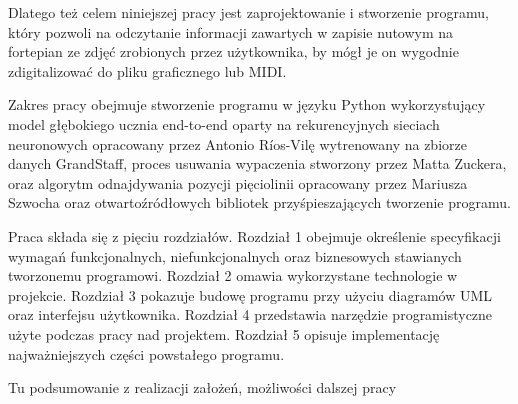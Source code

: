 \documentclass[xodstep]{wnspt}
\begin{document}
Dlatego też celem niniejszej pracy jest zaprojektowanie i stworzenie programu, który pozwoli na odczytanie informacji zawartych w zapisie nutowym na fortepian ze zdjęć zrobionych przez użytkownika, by mógł je on wygodnie zdigitalizować do pliku graficznego lub MIDI. 

Zakres pracy obejmuje stworzenie programu w języku Python wykorzystujący model głębokiego ucznia end-to-end oparty na rekurencyjnych sieciach neuronowych opracowany przez Antonio Ríos-Vilę wytrenowany na zbiorze danych GrandStaff\cite{Rios-Vila2023}, proces usuwania wypaczenia stworzony przez Matta Zuckera, oraz algorytm odnajdywania pozycji pięciolinii opracowany przez Mariusza Szwocha \cite{Szwoch2005} oraz otwartoźródłowych bibliotek przyśpieszających tworzenie programu.

Praca składa się z pięciu rozdziałów. Rozdział 1 obejmuje określenie specyfikacji wymagań funkcjonalnych, niefunkcjonalnych oraz biznesowych stawianych tworzonemu programowi. Rozdział 2 omawia wykorzystane technologie w projekcie. Rozdział 3 pokazuje budowę programu przy użyciu diagramów UML oraz interfejsu użytkownika. Rozdział 4 przedstawia narzędzie programistyczne użyte podczas pracy nad projektem. Rozdział 5 opisuje implementację najważniejszych części powstałego programu.








\summary
Tu podsumowanie z realizacji założeń, możliwości dalszej pracy




\listoftables

\listoffigures

\lstlistoflistings
\end{document}
